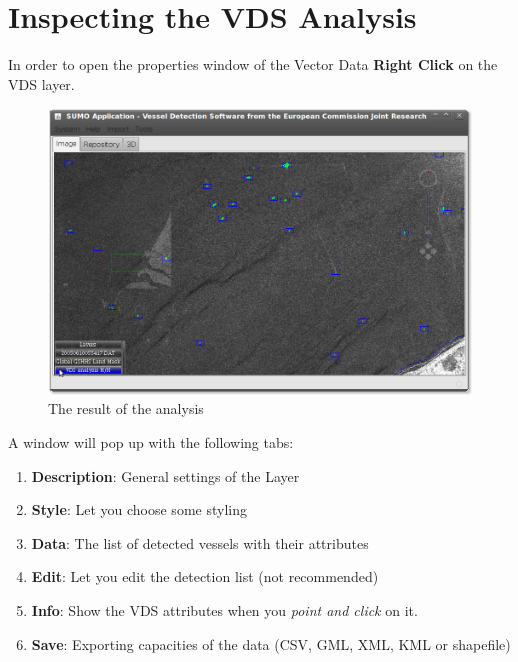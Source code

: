 \documentclass[12pt,a4paper,final]{report}
\begin{document}
\section{Inspecting the VDS Analysis}
In order to open the properties window of the Vector Data \textbf{Right Click} on the VDS layer.
\begin{figure}[H]
 \centering
 \includegraphics[scale=0.45,keepaspectratio=true]{./images/VDS5.png}
 \caption{The result of the analysis}
\end{figure}
A window will pop up with the following tabs:
\begin{enumerate}
 \item \textbf{Description}: General settings of the Layer
 \item \textbf{Style}: Let you choose some styling
 \item \textbf{Data}: The list of detected vessels with their attributes
 \item \textbf{Edit}: Let you edit the detection list (not recommended)
 \item \textbf{Info}: Show the VDS attributes when you \emph{point and click} on it.
 \item \textbf{Save}: Exporting capacities of the data (CSV, GML, XML, KML or shapefile)
\end{enumerate}
\end{document}
